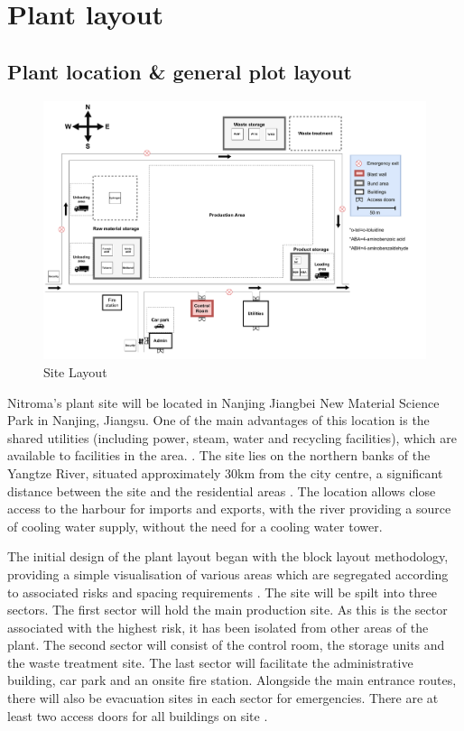\section{Plant layout}

\subsection{Plant location \& general plot layout}

\begin{figure}
\centering
\includegraphics[width=\linewidth]{chapters/5-safety-layout-environment/figures/Plantlayout3.pdf}
\caption{Site Layout}
\label{fig:site}
\end{figure}

Nitroma’s plant site will be located in Nanjing Jiangbei New Material Science Park in Nanjing, Jiangsu. One of the main advantages of this location is the shared utilities (including power, steam, water and recycling facilities), which are available to facilities in the area. \cite{independent_commodity_intelligence_services_china_2007}. The site lies on the northern banks of the Yangtze River, situated approximately 30km from the city centre, a significant distance between the site and the residential areas \cite{zeng_divergent_2011}. The location allows close access to the harbour for imports and exports, with the river providing a source of cooling water supply, without the need for a cooling water tower.

The initial design of the plant layout began with the block layout methodology, providing a simple visualisation of various areas which are segregated according to associated risks and spacing requirements \cite{center_for_chemical_process_safety_site_2010}. The site will be spilt into three sectors. The first sector will hold the main production site. As this is the sector associated with the highest risk, it has been isolated from other areas of the plant. The second sector will consist of the control room, the storage units and the waste treatment site. The last sector will facilitate the administrative building, car park and an onsite fire station. Alongside the main entrance routes, there will also be evacuation sites in each sector for emergencies. There are at least two access doors for all buildings on site \cite{aiche_dows_1994}. 

